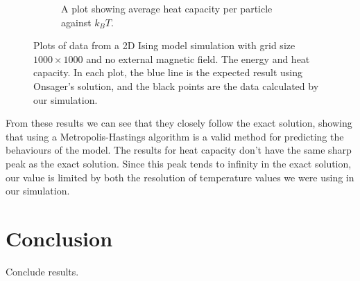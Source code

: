 \documentclass[11pt]{article}
\begin{document}
\begin{figure}[H]
\begin{subfigure}{0.45\textwidth}
\begin{center}
			\end{center}
			\caption{A plot showing average heat capacity per particle against $k_BT$.}
		\end{subfigure}
	
		\caption{Plots of data from a 2D Ising model simulation with grid size $1000 \times 1000$ and no external magnetic field. The energy and heat capacity. In each plot, the blue line is the expected result using Onsager's solution, and the black points are the data calculated by our simulation.}
		\label{fig:2d_1000_result}
	\end{figure}
	
	From these results we can see that they closely follow the exact solution, showing that using a Metropolis-Hastings algorithm is a valid method for predicting the behaviours of the model. The results for heat capacity don't have the same sharp peak as the exact solution. Since this peak tends to infinity in the exact solution, our value is limited by both the resolution of temperature values we were using in our simulation.
	
	\section{Conclusion}
	
	Conclude results.
	
	\newpage
	 
	
\end{document}
